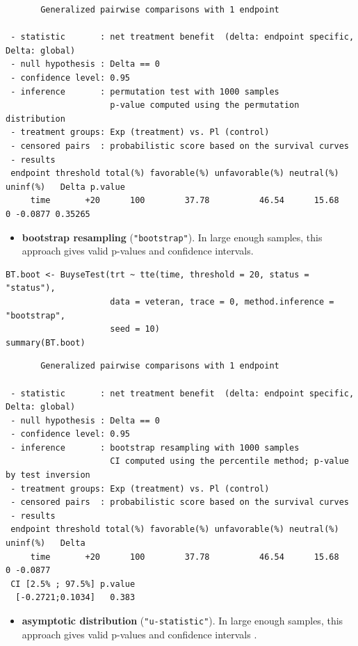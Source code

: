 \documentclass[12pt]{article}
\begin{document}
\begin{verbatim}
       Generalized pairwise comparisons with 1 endpoint

 - statistic       : net treatment benefit  (delta: endpoint specific, Delta: global) 
 - null hypothesis : Delta == 0 
 - confidence level: 0.95 
 - inference       : permutation test with 1000 samples 
                     p-value computed using the permutation distribution 
 - treatment groups: Exp (treatment) vs. Pl (control) 
 - censored pairs  : probabilistic score based on the survival curves
 - results
 endpoint threshold total(%) favorable(%) unfavorable(%) neutral(%) uninf(%)   Delta p.value 
     time       +20      100        37.78          46.54      15.68        0 -0.0877 0.35265
\end{verbatim}

\begin{itemize}
\item \textbf{bootstrap resampling} (\texttt{"bootstrap"}). In large enough samples, this approach gives valid
p-values and confidence intervals.
\end{itemize}

\lstset{language=r,label= ,caption= ,captionpos=b,numbers=none}
\begin{lstlisting}
BT.boot <- BuyseTest(trt ~ tte(time, threshold = 20, status = "status"),
                     data = veteran, trace = 0, method.inference = "bootstrap",
                     seed = 10) 
summary(BT.boot)
\end{lstlisting}

\begin{verbatim}
       Generalized pairwise comparisons with 1 endpoint

 - statistic       : net treatment benefit  (delta: endpoint specific, Delta: global) 
 - null hypothesis : Delta == 0 
 - confidence level: 0.95 
 - inference       : bootstrap resampling with 1000 samples 
                     CI computed using the percentile method; p-value by test inversion 
 - treatment groups: Exp (treatment) vs. Pl (control) 
 - censored pairs  : probabilistic score based on the survival curves
 - results
 endpoint threshold total(%) favorable(%) unfavorable(%) neutral(%) uninf(%)   Delta
     time       +20      100        37.78          46.54      15.68        0 -0.0877
 CI [2.5% ; 97.5%] p.value 
  [-0.2721;0.1034]   0.383
\end{verbatim}

\begin{itemize}
\item \textbf{asymptotic distribution} (\texttt{"u-statistic"}). In large enough
samples, this approach gives valid p-values and confidence intervals
\citep{ozenne2021asymptotic}.
\end{itemize}
\end{document}
